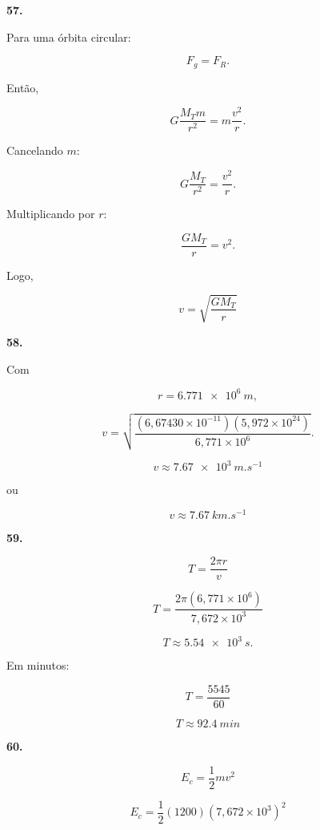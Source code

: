 \documentclass[11pt,a4paper]{article}
\begin{document}
	\begin{solucaobox}[Questões 57--61]
		
		\textbf{57.}
		
		Para uma órbita circular:
		
		\[
		F_g=F_R.
		\]
		
		Então,
		
		\[
		G\frac{M_Tm}{r^2}
		=
		m\frac{v^2}{r}.
		\]
		
		Cancelando $m$:
		
		\[
		G\frac{M_T}{r^2}
		=
		\frac{v^2}{r}.
		\]
		
		Multiplicando por $r$:
		
		\[
		\frac{GM_T}{r}
		=
		v^2.
		\]
		
		Logo,
		
		\[
		\boxed{
			v=
			\sqrt{\frac{GM_T}{r}}
		}
		\]
		
		\vspace{3mm}
		
		\textbf{58.}
		
		Com
		
		\[
		r=\SI{6.771e6}{m},
		\]
		
		\[
		v=
		\sqrt{
			\frac{
				(6{,}67430\times10^{-11})
				(5{,}972\times10^{24})
			}{
				6{,}771\times10^6
			}
		}.
		\]
		
		\[
		\boxed{
			v\approx\SI{7.67e3}{m.s^{-1}}
		}
		\]
		
		ou
		
		\[
		\boxed{
			v\approx\SI{7.67}{km.s^{-1}}
		}
		\]
		
		\vspace{3mm}
		
		\textbf{59.}
		
		\[
		T=
		\frac{2\pi r}{v}
		\]
		
		\[
		T=
		\frac{
			2\pi(6{,}771\times10^6)
		}{
			7{,}672\times10^3
		}
		\]
		
		\[
		T\approx\SI{5.54e3}{s}.
		\]
		
		Em minutos:
		
		\[
		T=
		\frac{5545}{60}
		\]
		
		\[
		\boxed{
			T\approx\SI{92.4}{min}
		}
		\]
		
		\vspace{3mm}
		
		\textbf{60.}
		
		\[
		E_c=
		\frac12mv^2
		\]
		
		\[
		E_c=
		\frac12
		(1200)
		(7{,}672\times10^3)^2
		\]
		

\end{solucaobox}
\end{document}
